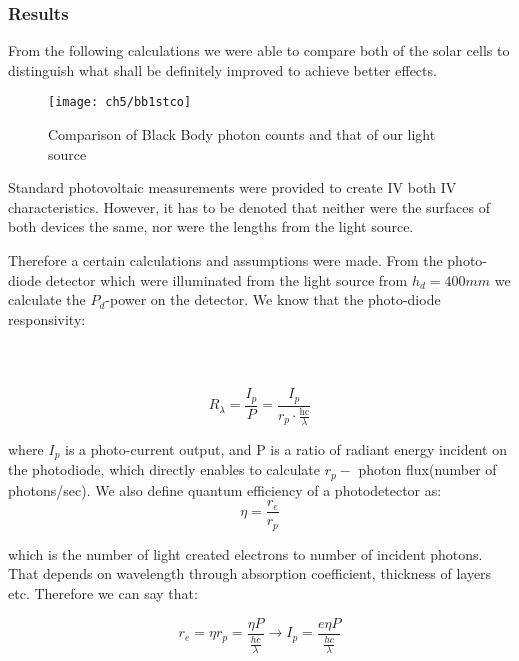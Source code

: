 \newpage
\subsubsection{Results}
From the following calculations we were able to compare both of the solar cells to distinguish what shall be definitely improved to achieve better effects. 

\begin{wrapfigure}{l}{0.451\textwidth}
\center
\texttt{[image: ch5/bb1stco]}
\caption{Comparison of Black Body photon counts and that of our light source}
\end{wrapfigure}

Standard photovoltaic measurements were provided to create IV both IV characteristics. However, it has to be denoted that neither were the surfaces of both devices the same, nor were the lengths from the light source. 

\noindent Therefore a certain calculations and assumptions were made. From the
photo-diode detector which were illuminated from the light source from
\(h_{d} = 400mm\) we calculate the \(P_{d}\)-power on the detector. We know that the photo-diode responsivity: \\ \\ \\ \\ 

\begin{equation}
R_{\lambda} = \frac{I_{p}}{P} = \frac{I_{p}}{r_{p} \cdot \frac{\text{hc}}{\lambda}}
\end{equation}


\noindent where \(I_{p}\) is a photo-current output, and P is a ratio of radiant
energy incident on the photodiode, which directly enables to calculate
\(r_{p} -\) photon flux(number of photons/sec). We also define quantum
efficiency of a photodetector as:
\begin{equation}
\eta = \frac{r_{e}}{r_{p}}
\end{equation}


\noindent which is the number of light created electrons to number of incident
photons. That depends on wavelength through absorption coefficient,
thickness of layers etc. Therefore we can say that:

\begin{equation}
r_{e} = \eta r_{p} = \frac{\eta P}{\frac{hc}{\lambda}} \rightarrow I_{p} = \frac{e\eta P}{\frac{hc}{\lambda}}
\end{equation}


